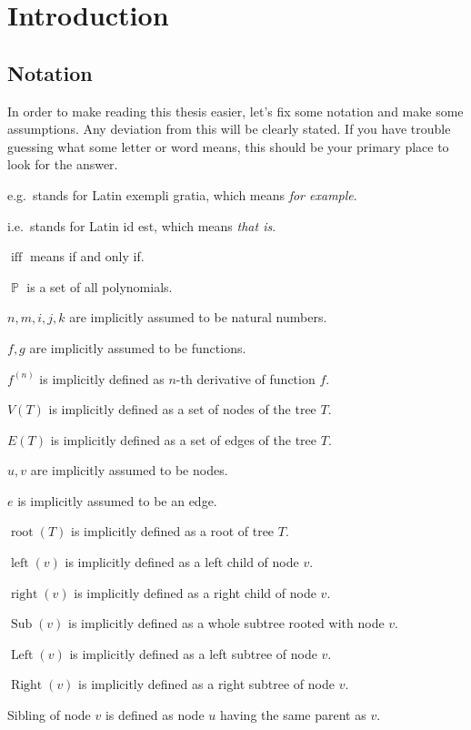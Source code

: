 \documentclass[final]{article}
\theoremstyle{definition}
\theoremstyle{remark}
\DeclareMathOperator{\textiff}{\text{iff}}
\DeclareMathOperator{\poly}{\mathbb{P}}
\DeclareMathOperator{\troot}{\text{root}}
\DeclareMathOperator{\tleft}{\text{left}}
\DeclareMathOperator{\tright}{\text{right}}
\DeclareMathOperator{\tLeft}{\text{Left}}
\DeclareMathOperator{\tRight}{\text{Right}}
\DeclareMathOperator{\tSub}{\text{Sub}}
\begin{document}
\clearpage

\section{Introduction}%
\label{sec:introduction}

\subsection{Notation}%
\label{sub:notation}

In order to make reading this thesis easier, let's fix some notation and make some assumptions. Any deviation from this will be clearly stated. If you have trouble guessing what some letter or word means, this should be your primary place to look for the answer.

e.g.\ stands for Latin exempli gratia, which means \textit{for example}.

i.e.\ stands for Latin id est, which means \textit{that is}.

\(\textiff\) means if and only if.

\(\poly\) is a set of all polynomials.

\(n, m, i, j, k\) are implicitly assumed to be natural numbers.

\(f, g\) are implicitly assumed to be functions.

\(f^{(n)}\) is implicitly defined as \(n\)-th derivative of function \(f\).

\(V(T)\) is implicitly defined as a set of nodes of the tree \(T\).

\(E(T)\) is implicitly defined as a set of edges of the tree \(T\).

\(u, v\) are implicitly assumed to be nodes.

\(e\) is implicitly assumed to be an edge.

\(\troot(T)\) is implicitly defined as a root of tree \(T\).

\(\tleft(v)\) is implicitly defined as a left child of node \(v\).

\(\tright(v)\) is implicitly defined as a right child of node \(v\).

\(\tSub(v)\) is implicitly defined as a whole subtree rooted with node \(v\).

\(\tLeft(v)\) is implicitly defined as a left subtree of node \(v\).

\(\tRight(v)\) is implicitly defined as a right subtree of node \(v\).

Sibling of node \(v\) is defined as node \(u\) having the same parent as \(v\).
\end{document}
